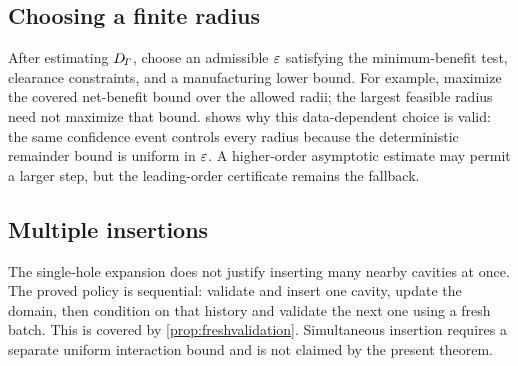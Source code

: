 \subsection{Choosing a finite radius}

After estimating $D_{\!T}$, choose an admissible $\varepsilon$ satisfying the minimum-benefit test, clearance constraints, and a manufacturing lower bound. For example, maximize the covered net-benefit bound over the allowed radii; the largest feasible radius need not maximize that bound.
 shows why this data-dependent choice is valid: the
same confidence event controls every radius because the deterministic remainder
bound is uniform in $\varepsilon$.  A higher-order asymptotic estimate may permit a
larger step, but the leading-order certificate remains the fallback.

\subsection{Multiple insertions}

The single-hole expansion does not justify inserting many nearby cavities at
once.  The proved policy is sequential: validate and insert one cavity, update
the domain, then condition on that history and validate the next one using a
fresh batch.  This is covered by \cref{prop:freshvalidation}.  Simultaneous
insertion requires a separate uniform interaction bound and is not claimed by
the present theorem.
